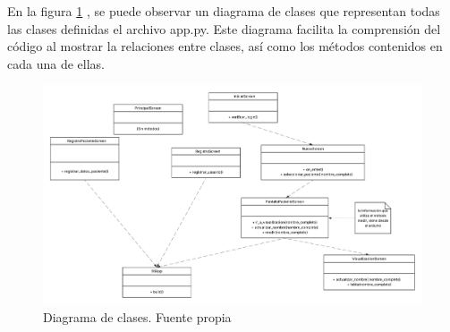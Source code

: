 En la figura \ref{fig:Diagrama_de_clases} , se puede observar un diagrama de clases que representan todas las clases definidas el archivo app.py. Este diagrama facilita la comprensión del código al mostrar la relaciones entre clases, así como los métodos contenidos en cada una de ellas.
\begin{figure}
    \centering
    \includegraphics[width=1\linewidth]{img/Diagrama de clases.png}
    \caption{Diagrama de clases. Fuente propia}
    \label{fig:Diagrama_de_clases}
\end{figure}